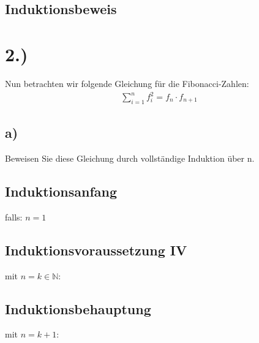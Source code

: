 \documentclass[titlepage]{article}
\begin{document}
		\subsection*{Induktionsbeweis}
		
	\section*{2.)}Nun betrachten wir folgende Gleichung für die Fibonacci-Zahlen:
		\begin{align*}
			\sum^n_{i=1}f^2_i=f_n\cdot f_{n+1}
		\end{align*}
		\subsection*{a)}Beweisen Sie diese Gleichung durch vollständige Induktion über n.
			\subsection*{Induktionsanfang} falls: $n=1$\\
			\subsection*{Induktionsvoraussetzung IV}
			mit $n=k\in\mathbb{N}$:\\
			\subsection*{Induktionsbehauptung}
			mit $n=k+1$:\\
\end{document}
